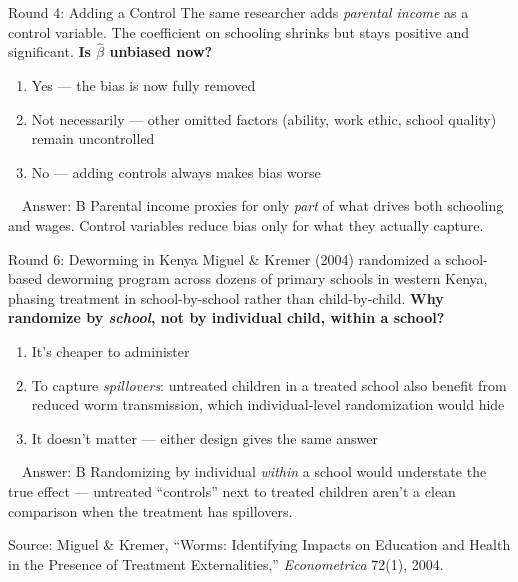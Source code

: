 \documentclass[11pt,aspectratio=169]{beamer}
\newcommand{\srcnote}[1]{{\footnotesize\color{wugray}Source: #1}}
\begin{document}
\begin{frame}{Round 4: Adding a Control}
  \small
  The same researcher adds \emph{parental income} as a control variable. The coefficient on schooling shrinks but stays positive and significant.
  \vspace{0.5em}
  \textbf{Is \(\hat\beta\) unbiased now?}
  \begin{enumerate}
    \item[\textbf{A}] Yes --- the bias is now fully removed
    \item[\textbf{B}] Not necessarily --- other omitted factors (ability, work ethic, school quality) remain uncontrolled
    \item[\textbf{C}] No --- adding controls always makes bias worse
  \end{enumerate}
  \pause
  \vspace{0.3em}
  \begin{alertblock}{\faCheckCircle\ \ Answer: B}
    Parental income proxies for only \emph{part} of what drives both schooling and wages. Control variables reduce bias only for what they actually capture.
  \end{alertblock}
\end{frame}

 

\begin{frame}{Round 6: Deworming in Kenya}
  \small
  Miguel \& Kremer (2004) randomized a school-based deworming program across dozens of primary schools in western Kenya, phasing treatment in school-by-school rather than child-by-child.
  \vspace{0.5em}
  \textbf{Why randomize by \emph{school}, not by individual child, within a school?}
  \begin{enumerate}
    \item[\textbf{A}] It's cheaper to administer
    \item[\textbf{B}] To capture \emph{spillovers}: untreated children in a treated school also benefit from reduced worm transmission, which individual-level randomization would hide
    \item[\textbf{C}] It doesn't matter --- either design gives the same answer
  \end{enumerate}
  \pause
  \vspace{0.3em}
  \begin{alertblock}{\faCheckCircle\ \ Answer: B}
    Randomizing by individual \emph{within} a school would understate the true effect --- untreated ``controls'' next to treated children aren't a clean comparison when the treatment has spillovers.
  \end{alertblock}
  \srcnote{Miguel \& Kremer, ``Worms: Identifying Impacts on Education and Health in the Presence of Treatment Externalities,'' \emph{Econometrica} 72(1), 2004.}
\end{frame}
\end{document}
